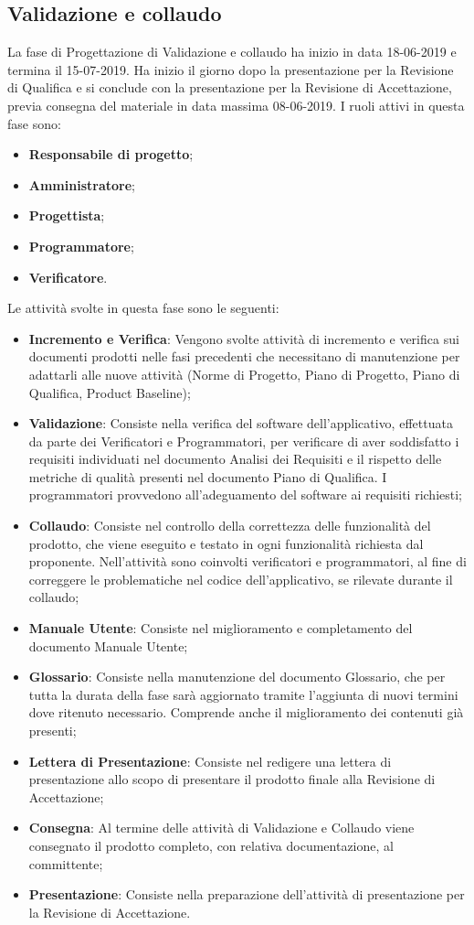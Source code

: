 \subsection{Validazione e collaudo}
La fase di Progettazione di Validazione e collaudo ha inizio in data 18-06-2019 e termina il 15-07-2019. Ha inizio il giorno dopo la presentazione per la Revisione di Qualifica e si conclude con la presentazione per la Revisione di Accettazione, previa consegna del materiale in data massima 08-06-2019.
I ruoli attivi in questa fase sono:
\begin{itemize}
    \item \textbf{Responsabile di progetto};
    \item \textbf{Amministratore};
    \item \textbf{Progettista};
    \item \textbf{Programmatore};
    \item \textbf{Verificatore}.
\end{itemize}
Le attività svolte in questa fase sono le seguenti:
\begin{itemize}
    \item \textbf{Incremento e Verifica}: Vengono svolte attività di incremento e verifica sui documenti prodotti nelle fasi precedenti che necessitano di manutenzione per adattarli alle nuove attività (Norme di Progetto, Piano di Progetto, Piano di Qualifica, Product Baseline);
    \item \textbf{Validazione}: Consiste nella verifica del software dell'applicativo, effettuata da parte dei Verificatori e Programmatori, per verificare di aver soddisfatto i requisiti individuati nel documento Analisi dei Requisiti e il rispetto delle metriche di qualità presenti nel documento Piano di Qualifica. I programmatori provvedono all'adeguamento del software ai requisiti richiesti;
    \item \textbf{Collaudo}: Consiste nel controllo della correttezza delle funzionalità del prodotto, che viene eseguito e testato in ogni funzionalità richiesta dal proponente. Nell'attività sono coinvolti verificatori e programmatori, al fine di correggere le problematiche nel codice dell'applicativo, se rilevate durante il collaudo;
    \item \textbf{Manuale Utente}: Consiste nel miglioramento e completamento del documento Manuale Utente;
    \item \textbf{Glossario}: Consiste nella manutenzione del documento Glossario, che per tutta la durata della fase sarà aggiornato tramite l'aggiunta di nuovi termini dove ritenuto necessario. Comprende anche il miglioramento dei contenuti già presenti;
    \item \textbf{Lettera di Presentazione}: Consiste nel redigere una lettera di presentazione allo scopo di presentare il prodotto finale alla Revisione di Accettazione;
    \item \textbf{Consegna}: Al termine delle attività di Validazione e Collaudo viene consegnato il prodotto completo, con relativa documentazione, al committente;
    \item \textbf{Presentazione}: Consiste nella preparazione dell'attività di presentazione per la Revisione di Accettazione.
\end{itemize}
